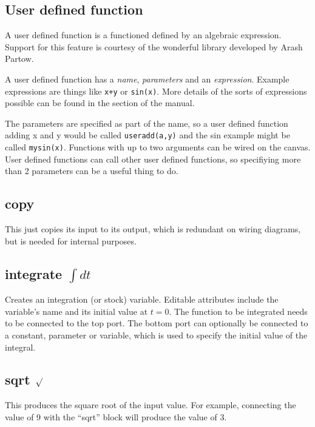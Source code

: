 \subsection{User defined
  function}\label{Operation:userFunction}\label{UserFunction}

A user defined function is a functioned defined by an algebraic
expression. Support for this feature is courtesy of the wonderful
library developed by Arash Partow.

A user defined function has a {\em name}, {\em parameters} and an {\em
  expression}. Example expressions are things like \verb'x+y' or
\verb'sin(x)'. More details of the sorts of expressions possible can
be found in the  section of
the manual.

The parameters are specified as part of the name, so a user defined
function adding x and y would be called \verb'useradd(a,y)' and the
sin example might be called \verb'mysin(x)'. Functions with up to two
arguments can be wired on the canvas. User defined functions can call
other user defined functions, so specifiying more than 2 parameters
can be a useful thing to do.

\subsection{copy}\label{Operation:copy} This just copies its input to its output,
which is redundant on wiring diagrams, but is needed for internal
purposes.

\subsection{integrate $\int dt$}\label{IntOp}  Creates an integration (or stock)
variable. Editable attributes include the variable's name and its
initial value at $t=0$. The function to be integrated needs to be
connected to the top port. The bottom port can optionally be connected
to a constant, parameter or variable, which is used to specify the
initial value of the integral.

\subsection{sqrt $\surd$}\label{Operation:sqrt} This produces the square root of 
the input value. For example, connecting the value of 9 with the
``sqrt'' block will produce the value of 3.


